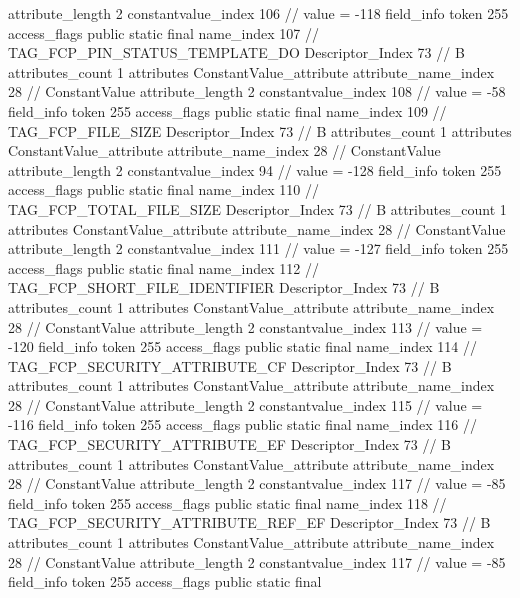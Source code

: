 {{{{{{{					attribute_length	2
					constantvalue_index	106		// value = -118
				}
				}
			}
			field_info {
				token	255
				access_flags	public static final
				name_index	107		// TAG_FCP_PIN_STATUS_TEMPLATE_DO
				Descriptor_Index	73		// B
				attributes_count	1
				attributes {
				ConstantValue_attribute {
					attribute_name_index	28		// ConstantValue
					attribute_length	2
					constantvalue_index	108		// value = -58
				}
				}
			}
			field_info {
				token	255
				access_flags	public static final
				name_index	109		// TAG_FCP_FILE_SIZE
				Descriptor_Index	73		// B
				attributes_count	1
				attributes {
				ConstantValue_attribute {
					attribute_name_index	28		// ConstantValue
					attribute_length	2
					constantvalue_index	94		// value = -128
				}
				}
			}
			field_info {
				token	255
				access_flags	public static final
				name_index	110		// TAG_FCP_TOTAL_FILE_SIZE
				Descriptor_Index	73		// B
				attributes_count	1
				attributes {
				ConstantValue_attribute {
					attribute_name_index	28		// ConstantValue
					attribute_length	2
					constantvalue_index	111		// value = -127
				}
				}
			}
			field_info {
				token	255
				access_flags	public static final
				name_index	112		// TAG_FCP_SHORT_FILE_IDENTIFIER
				Descriptor_Index	73		// B
				attributes_count	1
				attributes {
				ConstantValue_attribute {
					attribute_name_index	28		// ConstantValue
					attribute_length	2
					constantvalue_index	113		// value = -120
				}
				}
			}
			field_info {
				token	255
				access_flags	public static final
				name_index	114		// TAG_FCP_SECURITY_ATTRIBUTE_CF
				Descriptor_Index	73		// B
				attributes_count	1
				attributes {
				ConstantValue_attribute {
					attribute_name_index	28		// ConstantValue
					attribute_length	2
					constantvalue_index	115		// value = -116
				}
				}
			}
			field_info {
				token	255
				access_flags	public static final
				name_index	116		// TAG_FCP_SECURITY_ATTRIBUTE_EF
				Descriptor_Index	73		// B
				attributes_count	1
				attributes {
				ConstantValue_attribute {
					attribute_name_index	28		// ConstantValue
					attribute_length	2
					constantvalue_index	117		// value = -85
				}
				}
			}
			field_info {
				token	255
				access_flags	public static final
				name_index	118		// TAG_FCP_SECURITY_ATTRIBUTE_REF_EF
				Descriptor_Index	73		// B
				attributes_count	1
				attributes {
				ConstantValue_attribute {
					attribute_name_index	28		// ConstantValue
					attribute_length	2
					constantvalue_index	117		// value = -85
				}
				}
			}
			field_info {
				token	255
				access_flags	public static final
}}}}}
